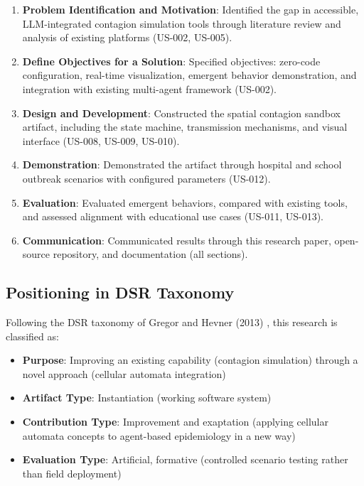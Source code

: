 \begin{enumerate}
    \item \textbf{Problem Identification and Motivation}: Identified the gap in accessible, LLM-integrated contagion simulation tools through literature review and analysis of existing platforms (US-002, US-005).
    
    \item \textbf{Define Objectives for a Solution}: Specified objectives: zero-code configuration, real-time visualization, emergent behavior demonstration, and integration with existing multi-agent framework (US-002).
    
    \item \textbf{Design and Development}: Constructed the spatial contagion sandbox artifact, including the state machine, transmission mechanisms, and visual interface (US-008, US-009, US-010).
    
    \item \textbf{Demonstration}: Demonstrated the artifact through hospital and school outbreak scenarios with configured parameters (US-012).
    
    \item \textbf{Evaluation}: Evaluated emergent behaviors, compared with existing tools, and assessed alignment with educational use cases (US-011, US-013).
    
    \item \textbf{Communication}: Communicated results through this research paper, open-source repository, and documentation (all sections).
\end{enumerate}

\subsection{Positioning in DSR Taxonomy}

Following the DSR taxonomy of Gregor and Hevner (2013) \cite{gregor2013positioning}, this research is classified as:

\begin{itemize}
    \item \textbf{Purpose}: Improving an existing capability (contagion simulation) through a novel approach (cellular automata integration)
    \item \textbf{Artifact Type}: Instantiation (working software system)
    \item \textbf{Contribution Type}: Improvement and exaptation (applying cellular automata concepts to agent-based epidemiology in a new way)
    \item \textbf{Evaluation Type}: Artificial, formative (controlled scenario testing rather than field deployment)
\end{itemize}

